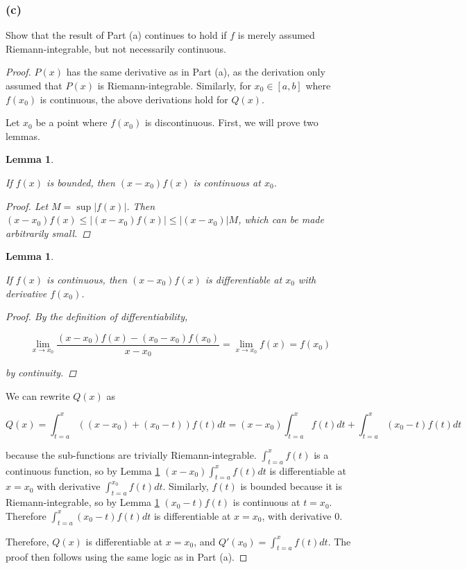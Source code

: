 \documentclass{amsart}
\newtheorem{lemma}[theorem]{Lemma}
\begin{document}
\subsubsection*{(c)}

Show that the result of Part (a) continues to hold if $f$ is merely assumed Riemann-integrable, but not necessarily continuous.

\begin{proof}

$P(x)$ has the same derivative as in Part (a), as the derivation only assumed that $P(x)$ is Riemann-integrable. Similarly, for $x_0 \in [a, b]$ where $f(x_0)$ is continuous, the above derivations hold for $Q(x)$.

Let $x_0$ be a point where $f(x_0)$ is discontinuous. First, we will prove two lemmas.

\begin{lemma}
\label{boundedIsCont}

If $f(x)$ is bounded, then $(x - x_0) f(x)$ is continuous at $x_0$.

\begin{proof}

Let $M = \sup |f(x)|$. Then $(x - x_0) f(x) \leq |(x - x_0) f(x)| \leq |(x - x_0)| M$, which can be made arbitrarily small.

\end{proof}
\end{lemma}

\begin{lemma}
\label{contIsDiff}

If $f(x)$ is continuous, then $(x - x_0) f(x)$ is differentiable at $x_0$ with derivative $f(x_0)$.

\begin{proof}

By the definition of differentiability,

\[
\lim_{x \to x_0} \frac{(x - x_0) f(x) - (x_0 - x_0) f(x_0)}{x - x_0}
= \lim_{x \to x_0} f(x) = f(x_0)
\]

by continuity.

\end{proof}
\end{lemma}

We can rewrite $Q(x)$ as

\[
Q(x) = \int_{t=a}^x ((x-x_0) + (x_0-t)) f(t) dt
= (x-x_0) \int_{t=a}^x f(t) dt + \int_{t=a}^x (x_0-t)f(t) dt
\]

because the sub-functions are trivially Riemann-integrable. $\int_{t=a}^x f(t)$ is a continuous function, so by Lemma \ref{contIsDiff} $(x-x_0) \int_{t=a}^x f(t) dt$ is differentiable at $x = x_0$ with derivative $\int_{t=a}^{x_0} f(t) dt$. Similarly, $f(t)$ is bounded because it is Riemann-integrable, so by Lemma \ref{boundedIsCont} $(x_0-t)f(t)$ is continuous at $t = x_0$. Therefore $\int_{t=a}^x (x_0-t)f(t) dt$ is differentiable at $x = x_0$, with derivative $0$.

Therefore, $Q(x)$ is differentiable at $x = x_0$, and $Q'(x_0) = \int_{t=a}^x f(t) dt$. The proof then follows using the same logic as in Part (a).

\end{proof}
\end{document}
